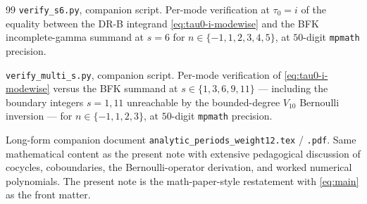 \documentclass[11pt,letterpaper]{article}
\begin{document}
\begin{thebibliography}{99}
\texttt{verify\_s6.py}, companion script.  Per-mode verification at
$\tau_0 = i$ of the equality between the DR-B integrand
\eqref{eq:tau0-i-modewise} and the BFK incomplete-gamma summand at
$s = 6$ for $n \in \{-1, 1, 2, 3, 4, 5\}$, at $50$-digit
\texttt{mpmath} precision.

\texttt{verify\_multi\_s.py}, companion script.  Per-mode verification
of \eqref{eq:tau0-i-modewise} versus the BFK summand at
$s \in \{1, 3, 6, 9, 11\}$ --- including the boundary integers
$s = 1, 11$ unreachable by the bounded-degree $V_{10}$ Bernoulli
inversion --- for $n \in \{-1, 1, 2, 3\}$, at $50$-digit
\texttt{mpmath} precision.

Long-form companion document \texttt{analytic\_periods\_weight12.tex}
/ \texttt{.pdf}.  Same mathematical content as the present note with
extensive pedagogical discussion of cocycles, coboundaries, the
Bernoulli-operator derivation, and worked numerical polynomials.  The
present note is the math-paper-style restatement with \eqref{eq:main}
as the front matter.

\end{thebibliography}
\end{document}
